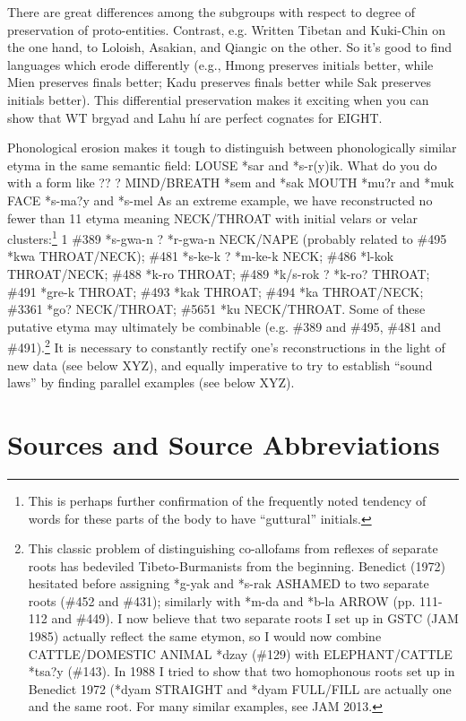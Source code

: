 There are great differences among the subgroups with respect to degree of preservation of proto-entities. Contrast, e.g. Written Tibetan and Kuki-Chin on the one hand, to Loloish, Asakian, and Qiangic on the other. So it’s good to find languages which erode differently (e.g., Hmong preserves initials better, while Mien preserves finals better; Kadu preserves finals better while Sak preserves initials better). This differential preservation makes it exciting when you can show that WT brgyad and Lahu hí are perfect cognates for EIGHT.

Phonological erosion makes it tough to distinguish between phonologically similar etyma in the same semantic field:
		LOUSE *sar and *s-r(y)ik. What do you do with a form like ?? ?
		MIND/BREATH *sem and *sak
		MOUTH *mu?r and *muk
		FACE *s-ma?y and *s-mel
As an extreme example, we have reconstructed no fewer than 11 etyma meaning NECK/THROAT with initial velars or velar clusters:\footnote{This is perhaps further confirmation of the frequently noted tendency of words for these parts of the body to have “guttural” initials.} 1 \#389 *s-gwa-n ? *r-gwa-n NECK/NAPE (probably related to \#495 *kwa THROAT/NECK); \#481 *s-ke-k ? *m-ke-k NECK; \#486 *l-kok THROAT/NECK; \#488 *k-ro THROAT; \#489 *k/s-rok ? *k-ro? THROAT; \#491 *gre-k THROAT; \#493 *kak THROAT; \#494 *ka THROAT/NECK; \#3361 *go? NECK/THROAT; \#5651 *ku NECK/THROAT.
	Some of these putative etyma may ultimately be combinable (e.g. \#389 and \#495, \#481 and \#491).\footnote{ This classic problem of distinguishing co-allofams from reflexes of separate roots has bedeviled Tibeto-Burmanists from the beginning. Benedict (1972) hesitated before assigning *g-yak and *s-rak ASHAMED to two separate roots (\#452 and \#431); similarly with *m-da and *b-la ARROW (pp. 111-112 and \#449). I now believe that two separate roots I set up in GSTC (JAM 1985) actually reflect the same etymon, so I would now combine CATTLE/DOMESTIC ANIMAL *dzay (\#129) with ELEPHANT/CATTLE *tsa?y (\#143). In 1988 I tried to show that two homophonous roots set up in Benedict 1972 (*dyam STRAIGHT and *dyam FULL/FILL are actually one and the same root. For many similar examples, see JAM 2013.} It is necessary to constantly rectify one’s reconstructions in the light of new data (see below XYZ), and equally imperative to try to establish “sound laws” by finding parallel examples (see below XYZ).
	
	
	
\section{Sources and Source Abbreviations}

